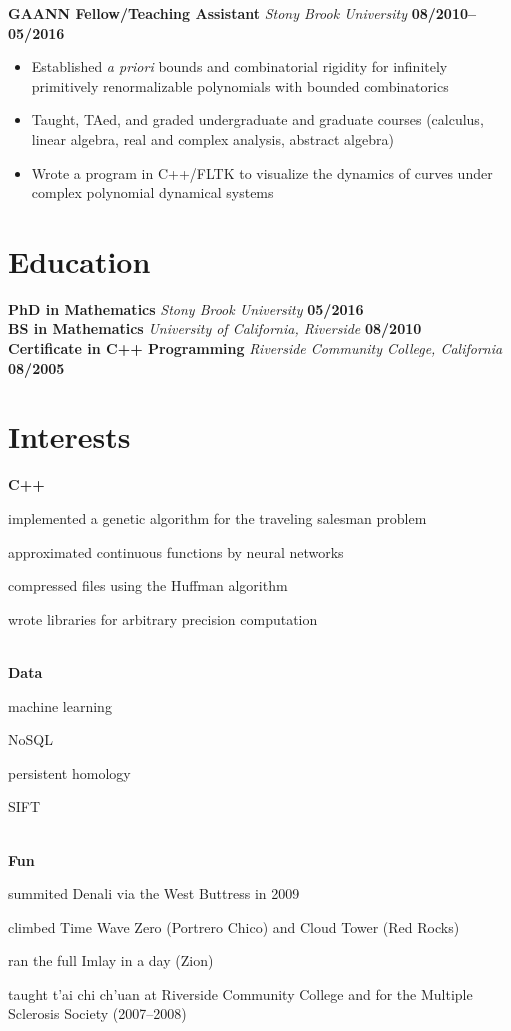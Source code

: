 \documentclass[11pt]{article}
\begin{document}
\vspace{0.5cm}
\noindent\textbf{GAANN Fellow/Teaching Assistant} \emph{Stony Brook University} \hfill \textbf{08/2010--05/2016}
\begin{itemize}
  \itemsep 0em
  \item Established \textit{a priori} bounds and combinatorial rigidity for infinitely primitively renormalizable polynomials with bounded combinatorics
  \item Taught, TAed, and graded undergraduate and graduate courses (calculus, linear algebra, real and complex analysis, abstract algebra)
  \item Wrote a program in C++/FLTK to visualize the dynamics of curves under complex polynomial dynamical systems
\end{itemize}

\section*{Education}
\noindent\textbf{PhD in Mathematics} \emph{Stony Brook University} \hfill \textbf{05/2016}\\
\noindent\textbf{BS in Mathematics} \emph{University of California, Riverside} \hfill \textbf{08/2010}\\
\noindent\textbf{Certificate in C++ Programming} \emph{Riverside Community College, California} \hfill \textbf{08/2005}

\section*{Interests}
\noindent\textbf{C++}
\begin{inparaitem}
\item implemented a genetic algorithm for the traveling salesman problem
\item approximated continuous functions by neural networks
\item compressed files using the Huffman algorithm
\item wrote libraries for arbitrary precision computation
\end{inparaitem}
\\
\noindent\textbf{Data}
\begin{inparaitem}
\item machine learning
\item NoSQL
\item persistent homology
\item SIFT
\end{inparaitem}
\\
\noindent\textbf{Fun}
\begin{inparaitem}
\item summited Denali via the West Buttress in 2009
\item climbed Time Wave Zero (Portrero Chico) and Cloud Tower (Red Rocks)
\item ran the full Imlay in a day (Zion)
\item taught t'ai chi ch'uan at Riverside Community College and for the Multiple Sclerosis Society (2007--2008)
\end{inparaitem}
\end{document}
